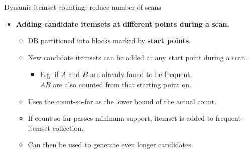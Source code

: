 \documentclass[aspectratio=169,t]{beamer}
\begin{document}
  {
    \begin{frame}{Dynamic itemset counting: reduce number of scans}
    \begin{itemize}
      \item \textbf{Adding candidate itemsets at different points during a scan.}
      \begin{itemize}
        \item DB partitioned into blocks marked by \textbf{\color{airforceblue}start points}.
        \item New candidate itemsets can be added at any start point during a scan.
        \begin{itemize}
            \item E.g. if $A$ and $B$ are already found to be frequent, \\
            $AB$ are also counted from that starting point on.
        \end{itemize}
        \item Uses the count-so-far as the lower bound of the actual count.
        \item If count-so-far passes minimum support, itemset is added to frequent-itemset collection.
        \item Can then be used to generate even longer candidates.
      \end{itemize}
    \end{itemize}
    \end{frame}
  }
\end{document}
